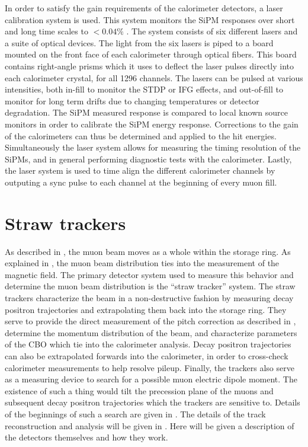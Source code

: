In order to satisfy the gain requirements of the calorimeter detectors, a laser calibration system is used. This system monitors the SiPM responses over short and long time scales to $< 0.04\%$ \cite{Anastasi:2017sos}. The system consists of six different lasers and a suite of optical devices. The light from the six lasers is piped to a board mounted on the front face of each calorimeter through optical fibers. This board contains right-angle prisms which it uses to deflect the laser pulses directly into each calorimeter crystal, for all 1296 channels. The lasers can be pulsed at various intensities, both in-fill to monitor the STDP or IFG effects, and out-of-fill to monitor for long term drifts due to changing temperatures or detector degradation. The SiPM measured response is compared to local known source monitors in order to calibrate the SiPM energy response. Corrections to the gain of the calorimeters can thus be determined and applied to the hit energies. Simultaneously the laser system allows for measuring the timing resolution of the SiPMs, and in general performing diagnostic tests with the calorimeter. Lastly, the laser system is used to time align the different calorimeter channels by outputing a sync pulse to each channel at the beginning of every muon fill.






\section{Straw trackers}
\label{sec:StrawTrackers}

As described in , the muon beam moves as a whole within the storage ring. As explained in , the muon beam distribution ties into the measurement of the magnetic field. The primary detector system used to measure this behavior and determine the muon beam distribution is the ``straw tracker'' system. The straw trackers characterize the beam in a non-destructive fashion by measuring decay positron trajectories and extrapolating them back into the storage ring. They serve to provide the direct measurement of the pitch correction as described in , determine the momentum distribution of the beam, and characterize parameters of the CBO which tie into the calorimeter \wa analysis. Decay positron trajectories can also be extrapolated forwards into the calorimeter, in order to cross-check calorimeter measurements to help resolve pileup. Finally, the trackers also serve as a measuring device to search for a possible muon electric dipole moment. The existence of such a thing would tilt the precession plane of the muons and subsequent decay positron trajectories which the trackers are sensitive to. Details of the beginnings of such a search are given in . The details of the track reconstruction and analysis will be given in . Here will be given a description of the detectors themselves and how they work.


